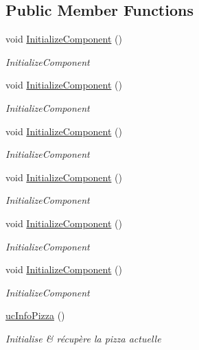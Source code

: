 \subsection*{Public Member Functions}
\begin{DoxyCompactItemize}
\item 
void \hyperlink{classnewPizza1_1_1ucInfoPizza_a5d6e37c02a381d24941d4f45b4a21dbe}{Initialize\+Component} ()
\begin{DoxyCompactList}\small\item\em Initialize\+Component \end{DoxyCompactList}\item 
void \hyperlink{classnewPizza1_1_1ucInfoPizza_a5d6e37c02a381d24941d4f45b4a21dbe}{Initialize\+Component} ()
\begin{DoxyCompactList}\small\item\em Initialize\+Component \end{DoxyCompactList}\item 
void \hyperlink{classnewPizza1_1_1ucInfoPizza_a5d6e37c02a381d24941d4f45b4a21dbe}{Initialize\+Component} ()
\begin{DoxyCompactList}\small\item\em Initialize\+Component \end{DoxyCompactList}\item 
void \hyperlink{classnewPizza1_1_1ucInfoPizza_a5d6e37c02a381d24941d4f45b4a21dbe}{Initialize\+Component} ()
\begin{DoxyCompactList}\small\item\em Initialize\+Component \end{DoxyCompactList}\item 
void \hyperlink{classnewPizza1_1_1ucInfoPizza_a5d6e37c02a381d24941d4f45b4a21dbe}{Initialize\+Component} ()
\begin{DoxyCompactList}\small\item\em Initialize\+Component \end{DoxyCompactList}\item 
void \hyperlink{classnewPizza1_1_1ucInfoPizza_a5d6e37c02a381d24941d4f45b4a21dbe}{Initialize\+Component} ()
\begin{DoxyCompactList}\small\item\em Initialize\+Component \end{DoxyCompactList}\item 
\hyperlink{classnewPizza1_1_1ucInfoPizza_aa43d76da91b98d3f8367d06832249f98}{uc\+Info\+Pizza} ()
\begin{DoxyCompactList}\small\item\em Initialise \& récupère la pizza actuelle \end{DoxyCompactList}\item 

\end{DoxyCompactItemize}
